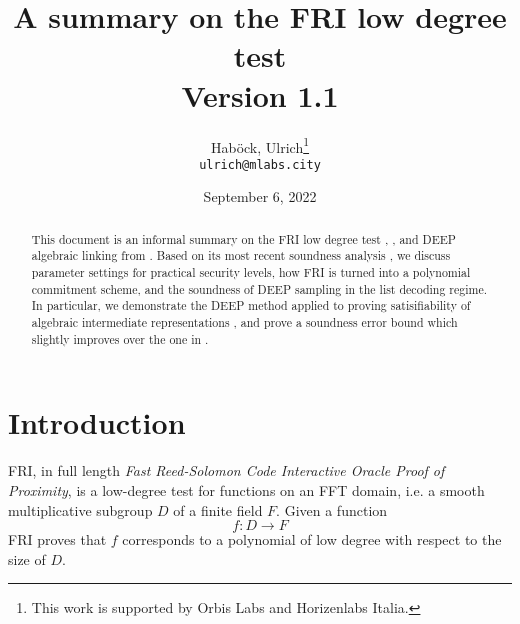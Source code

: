 \documentclass[11pt,article,oneside]{memoir}
\author{
    Hab{\"o}ck, Ulrich\thanks{This work is supported by Orbis Labs and Horizenlabs Italia.}
\\
    \texttt{ulrich@mlabs.city}
}
\theoremstyle{definition}
\theoremstyle{remark}
\begin{document}
\title{%
A summary on the FRI low degree test
\\
{\small Version 1.1}
}
\date{%
September 6, 2022
}
\maketitle

\setlength{\parskip}{5mm}


\begin{abstract}
This document is an informal summary on the FRI low degree test \cite{FRI}, \cite{ProximityGaps}, and DEEP algebraic linking from \cite{DEEPFRI}. 
Based on its most recent soundness analysis \cite{ProximityGaps}, we discuss parameter settings for practical security levels, how FRI is turned into a polynomial commitment scheme, and the soundness of DEEP sampling in the list decoding regime.
In particular, we demonstrate the DEEP method applied to proving satisifiability of algebraic intermediate representations \cite{Starks, DEEPFRI}, and prove a soundness error bound which slightly improves over the one in \cite{ethSTARK}.
\end{abstract}


\begin{KeepFromToc}
  \tableofcontents
\end{KeepFromToc}

\chapter{Introduction}
FRI, in full length \textit{Fast Reed-Solomon Code Interactive Oracle Proof of Proximity}, is a low-degree test for functions on an FFT domain, i.e. a smooth multiplicative subgroup $D$ of a finite field $F$.  
Given a function 
\[
f: D\longrightarrow F
\]
FRI proves that $f$ corresponds to a polynomial of low degree with respect to the size of $D$. 
\end{document}
